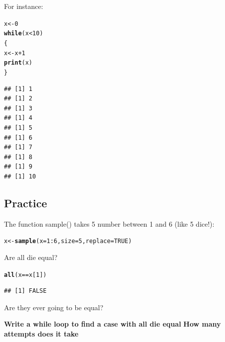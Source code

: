 \documentclass[12pt,a4paper]{scrartcl}\usepackage[]{graphicx}\usepackage[]{color}
\makeatletter
\newcommand{\hlnum}[1]{\textcolor[rgb]{0.686,0.059,0.569}{#1}}%
\newcommand{\hlopt}[1]{\textcolor[rgb]{0,0,0}{#1}}%
\newcommand{\hlstd}[1]{\textcolor[rgb]{0.345,0.345,0.345}{#1}}%
\newcommand{\hlkwa}[1]{\textcolor[rgb]{0.161,0.373,0.58}{\textbf{#1}}}%
\newcommand{\hlkwb}[1]{\textcolor[rgb]{0.69,0.353,0.396}{#1}}%
\newcommand{\hlkwc}[1]{\textcolor[rgb]{0.333,0.667,0.333}{#1}}%
\newcommand{\hlkwd}[1]{\textcolor[rgb]{0.737,0.353,0.396}{\textbf{#1}}}%
\newenvironment{kframe}{%
 \def\at@end@of@kframe{}%
 \ifinner\ifhmode%
  \def\at@end@of@kframe{\end{minipage}}%
  \begin{minipage}{\columnwidth}%
 \fi\fi%
 \def\FrameCommand##1{\hskip\@totalleftmargin \hskip-\fboxsep
 \colorbox{shadecolor}{##1}\hskip-\fboxsep
     \hskip-\linewidth \hskip-\@totalleftmargin \hskip\columnwidth}%
 \MakeFramed {\advance\hsize-\width
   \@totalleftmargin\z@ \linewidth\hsize
   \@setminipage}}%
 {\par\unskip\endMakeFramed%
 \at@end@of@kframe}
\newenvironment{knitrout}{}{} %
\makeatother
\begin{document}
For instance:
\begin{knitrout}
\color{fgcolor}\begin{kframe}
\begin{alltt}
\hlstd{x} \hlkwb{<-} \hlnum{0}
\hlkwa{while}\hlstd{(x}\hlopt{<}\hlnum{10}\hlstd{)}
    \hlstd{\{}
      \hlstd{x} \hlkwb{<-} \hlstd{x}\hlopt{+}\hlnum{1}
      \hlkwd{print}\hlstd{(x)}
    \hlstd{\}}
\end{alltt}
\begin{verbatim}
## [1] 1
## [1] 2
## [1] 3
## [1] 4
## [1] 5
## [1] 6
## [1] 7
## [1] 8
## [1] 9
## [1] 10
\end{verbatim}
\end{kframe}
\end{knitrout}
  
  
\subsection{Practice}

The function sample() takes 5 number between 1 and 6 (like 5 dice!):
\begin{knitrout}
\color{fgcolor}\begin{kframe}
\begin{alltt}
\hlstd{x} \hlkwb{<-} \hlkwd{sample}\hlstd{(}\hlkwc{x} \hlstd{=} \hlnum{1}\hlopt{:}\hlnum{6}\hlstd{,} \hlkwc{size} \hlstd{=} \hlnum{5}\hlstd{,} \hlkwc{replace} \hlstd{=} \hlnum{TRUE}\hlstd{)}
\end{alltt}
\end{kframe}
\end{knitrout}

Are all die equal?
\begin{knitrout}
\color{fgcolor}\begin{kframe}
\begin{alltt}
\hlkwd{all}\hlstd{(x} \hlopt{==} \hlstd{x[}\hlnum{1}\hlstd{])}
\end{alltt}
\begin{verbatim}
## [1] FALSE
\end{verbatim}
\end{kframe}
\end{knitrout}

Are they ever going to be equal?

\begin{Exercise}[difficulty=2]
\textbf{Write a while loop to find a case with all die equal}
\textbf{How many attempts does it take}
\end{Exercise}
\end{document}
